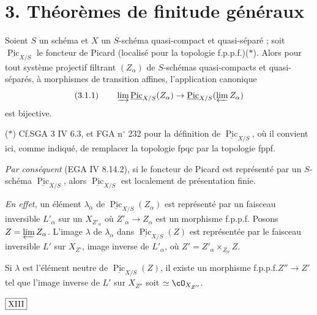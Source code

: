 \section*{3. Théorèmes de finitude généraux}

\begin{lem}\label{lem:3.1} Soient $S$ un schéma et $X$ un $S$-schéma quasi-compact et quasi-séparé ; soit $\underline{\operatorname{Pic}}_{X/S}$ le foncteur de Picard (localisé pour la topologie f.p.p.f.)\textup{($*$)}. Alors pour tout système projectif filtrant $(Z_{\alpha})$ de $S$-schémas quasi-compacts et quasi-séparés, à morphismes de transition affines, l'application canonique
\[
\text{(3.1.1)} \qquad \varinjlim \underline{\operatorname{Pic}}_{X/S}(Z_{\alpha}) \to \underline{\operatorname{Pic}}_{X/S}(\varprojlim Z_{\alpha})
\]
est bijective.

\smallskip
\noindent($*$) Cf.\@ SGA 3 IV 6.3, et FGA n$^\circ$ 232 pour la définition de $\underline{\operatorname{Pic}}_{X/S}$, où il convient ici, comme indiqué, de remplacer la topologie fpqc par la topologie fppf.
\end{lem}

\noindent\textit{Par conséquent} (EGA IV 8.14.2), si le foncteur de Picard est représenté par un $S$-schéma $\underline{\operatorname{Pic}}_{X/S}$, alors $\underline{\operatorname{Pic}}_{X/S}$ est localement de présentation finie.

\noindent\textit{En effet,} un élément $\lambda_{\alpha}$ de $\underline{\operatorname{Pic}}_{X/S}(Z_{\alpha})$ est représenté par un faisceau inversible $L'_{\alpha}$ sur un $X_{Z'_{\alpha}}$ où $Z'_{\alpha} \to Z_{\alpha}$ est un morphisme f.p.p.f. Posons $Z = \varprojlim Z_{\alpha}$. L'image $\lambda$ de $\lambda_{\alpha}$ dans $\underline{\operatorname{Pic}}_{X/S}(Z)$ est représentée par le faisceau inversible $L'$ sur $X_{Z'}$, image inverse de $L'_{\alpha}$, où $Z' = Z'_{\alpha} \times_{Z_{\alpha}} Z$.

Si $\lambda$ est l'élément neutre de $\underline{\operatorname{Pic}}_{X/S}(Z)$, il existe un morphisme f.p.p.f.\@ $Z'' \to Z'$ tel que l'image inverse de $L'$ sur $X_{Z''}$ soit $\simeq \cO_{X_{Z''}}$.

\begin{flushright}
$\fbox{\text{XIII}}$
\end{flushright}

